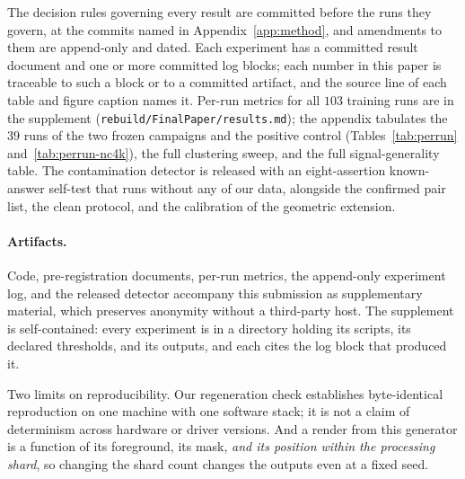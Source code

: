 \documentclass{article}
\begin{document}
The decision rules governing every result are committed before the runs they govern, at the commits
named in Appendix~\ref{app:method}, and amendments to them are append-only and dated. Each experiment
has a committed result document and one or more committed log blocks; each number in this paper is
traceable to such a block or to a committed artifact, and the source line of each table and figure
caption names it. Per-run metrics for all $103$ training runs are in the supplement
(\texttt{rebuild/FinalPaper/results.md}); the appendix tabulates the $39$ runs of the two frozen
campaigns and the positive control (Tables~\ref{tab:perrun} and~\ref{tab:perrun-nc4k}), the full
clustering sweep, and the full signal-generality table. The contamination detector is released with an
eight-assertion known-answer self-test that runs without any of our data, alongside the confirmed
pair list, the clean protocol, and the calibration of the geometric extension.

\paragraph{Artifacts.} Code, pre-registration documents, per-run metrics, the append-only experiment
log, and the released detector accompany this submission as supplementary material, which preserves
anonymity without a third-party host.
The supplement is self-contained: every experiment is in a directory holding its
scripts, its declared thresholds, and its outputs, and each cites the log block that produced it.

Two limits on reproducibility. Our regeneration check
establishes byte-identical reproduction on one machine with one software stack; it is not a claim of
determinism across hardware or driver versions. And a render from this generator is a function of its
foreground, its mask, \emph{and its position within the processing shard}, so changing the shard count
changes the outputs even at a fixed seed.




\appendix

\end{document}
